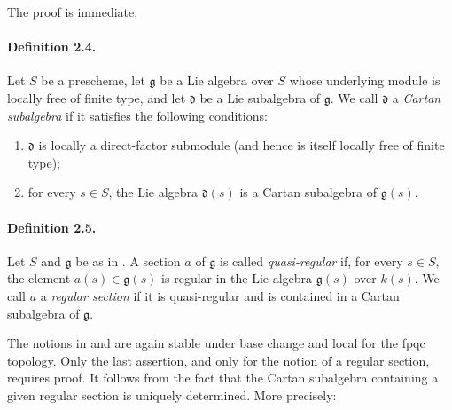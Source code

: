 The proof is immediate.

\paragraph{\textbf{Definition 2.4.}}
Let \(S\) be a prescheme, let \(\mathfrak g\) be a Lie algebra over
\(S\) whose underlying module is locally free of finite type, and
let \(\mathfrak d\) be a Lie subalgebra of \(\mathfrak g\). We call
\(\mathfrak d\) a \emph{Cartan subalgebra} if it satisfies the
following conditions:
\begin{enumerate}
\item[\textup{\SGAInlineRefTarget{sga3:xiv:2.4:item:i}(i)}] \(\mathfrak d\) is locally a direct-factor
  submodule \textup{(and hence is itself locally free of finite
  type)};
\item[\textup{(ii)}] for every \(s\in S\), the Lie algebra
  \(\mathfrak d(s)\) is a Cartan subalgebra of
  \(\mathfrak g(s)\).
\end{enumerate}

\paragraph{\textbf{Definition 2.5.}}
Let \(S\) and \(\mathfrak g\) be as in . A section \(a\) of
\(\mathfrak g\) is called \emph{quasi-regular} if, for every
\(s\in S\), the element \(a(s)\in\mathfrak g(s)\) is regular in the
Lie algebra \(\mathfrak g(s)\) over \(k(s)\). We call \(a\) a
\emph{regular section} if it is quasi-regular and is contained in a
Cartan subalgebra of \(\mathfrak g\).

The notions in  and  are again stable under base change and
local for the fpqc topology. Only the last assertion, and only for
the notion of a regular section, requires proof. It follows from the
fact that the Cartan subalgebra containing a given regular section
is uniquely determined. More precisely:



